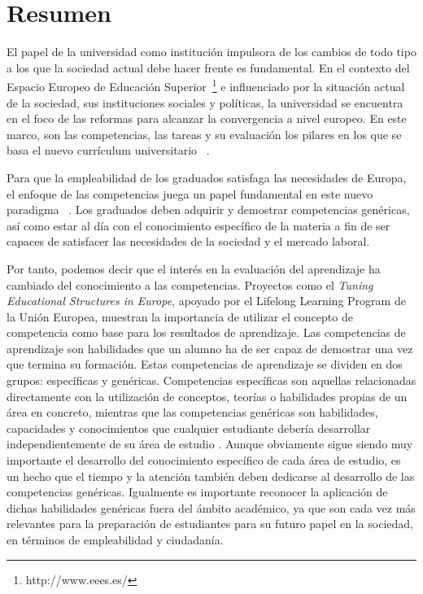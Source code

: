 
\section{Resumen}
\label{sec:Resumen}

El papel de la universidad como institución impulsora de los cambios de todo tipo a los que la sociedad actual debe hacer frente es fundamental. En el contexto del Espacio Europeo de Educación Superior~\footnote{http://www.eees.es/} e influenciado por la situación actual de  la sociedad, sus instituciones sociales y políticas, la universidad se encuentra en el foco de las reformas para alcanzar la convergencia a nivel europeo. En este marco, son las competencias, las tareas y su evaluación los pilares en los que se basa el nuevo currículum universitario ~\cite{zabala2005espacio}.

Para que la empleabilidad de los graduados satisfaga las necesidades de Europa, el enfoque de las competencias juega un papel fundamental en este nuevo paradigma  ~\cite{communique2012making}. Los graduados deben adquirir y demostrar competencias genéricas, así como estar al día con el conocimiento específico de la materia a fin de ser capaces de satisfacer las necesidades de la sociedad y el mercado laboral.

Por tanto, podemos decir que el interés en la evaluación del aprendizaje ha cambiado del conocimiento a las competencias.
Proyectos como el \emph{Tuning Educational Structures in Europe}, apoyado por el Lifelong Learning Program de la Unión Europea, muestran la importancia de utilizar el concepto de competencia como base para los resultados de aprendizaje. Las competencias de aprendizaje son habilidades que un alumno ha de ser capaz de demostrar una vez que termina su formación. Estas competencias de aprendizaje se dividen en dos grupos: específicas y genéricas. Competencias específicas son aquellas relacionadas directamente con la utilización de conceptos, teorías o habilidades propias de un área en concreto, mientras que las competencias genéricas son habilidades, capacidades y conocimientos que cualquier estudiante debería desarrollar independientemente de su área de estudio \cite{gonzalez2003tuning}. Aunque obviamente sigue siendo muy importante el desarrollo del conocimiento específico de cada área de estudio, es un hecho que el tiempo y la atención también deben dedicarse al desarrollo de las competencias genéricas. Igualmente es importante reconocer la aplicación de dichas habilidades genéricas fuera del ámbito académico, ya que son cada vez más relevantes para la preparación de estudiantes para su futuro papel en la sociedad, en términos de empleabilidad y ciudadanía.

